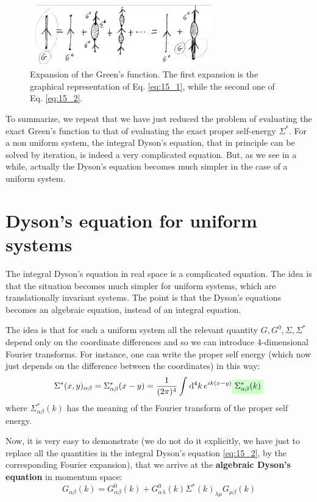 \documentclass[../main/main.tex]{subfiles}
\begin{document}
\begin{figure}[h!]
\centering
\includegraphics[width=0.7\textwidth]{../lessons/15_image/4.png}
\caption{\label{fig:15_6} Expansion of the Green's function. The first expansion is the graphical representation of Eq. \eqref{eq:15_1}, while the second one of Eq. \eqref{eq:15_2}.}
\end{figure}

To summarize, we repeat that we have just reduced the problem of evaluating the exact Green's function to that of evaluating the exact proper self-energy \( \Sigma ^* \).
For a non uniform system, the integral Dyson's equation, that in principle can be solved by iteration, is indeed a very complicated equation. But, as we see in a while, actually the Dyson's equation becomes much simpler in the case of a uniform system.

\section{Dyson's equation for uniform systems}
The integral Dyson's equation in real space is a complicated equation.
The idea is that the situation becomes much simpler for uniform systems, which are translationally invariant systems. The point is that the Dyson's equations becomes an algebraic equation, instead of an integral equation.

The idea is that for such a uniform system all the relevant quantity \( G,G^0, \Sigma , \Sigma ^* \) depend only on the coordinate differences and so we can introduce 4-dimensional Fourier transforms. For instance, one can write the proper self energy (which now just depends on the difference between the coordinates) in this way:
\begin{equation*}
  \Sigma ^* (x,y)_{\alpha \beta } = \Sigma ^* _{\alpha \beta } (x-y)
  = \frac{1}{(2 \pi )^4} \int_{}^{} \dd[4]{k} e^{i k (x-y)} \mathcolorbox{green!20}{\Sigma ^*_{\alpha \beta } (k) }
\end{equation*}
where \( \Sigma _{\alpha \beta }^* (k) \) has the meaning of the Fourier transform of the proper self energy.

Now, it is very easy to demonstrate (we do not do it explicitly, we have just to replace all the quantities in the integral Dyson's equation \eqref{eq:15_2}, by the corresponding Fourier expansion), that we arrive at the \textbf{algebraic Dyson's equation} in momentum space:
\begin{equation*}
  G_{\alpha \beta } (k) = G_{\alpha \beta }^0 (k) + G_{\alpha \lambda }^0 (k) \Sigma ^* (k)_{\lambda \mu } G_{\mu \beta } (k)
\end{equation*}
\end{document}
